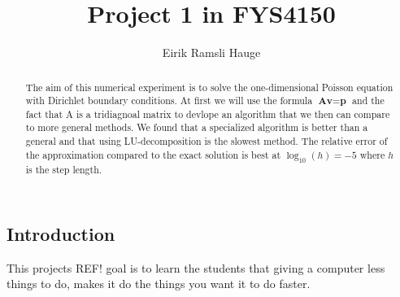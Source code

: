 \documentclass[12pt,a4paper]{article}
\author{Eirik Ramsli Hauge}
\title{Project 1 in FYS4150}
\newcommand{\V}[1]{\textbf{#1}}
\newcommand{\husk}[1]{\color{red} #1 \color{black}}
\begin{document}
	\maketitle
	
\begin{abstract}
The aim of this numerical experiment is to solve the one-dimensional Poisson equation with Dirichlet boundary conditions. At first we will use the formula $\V{A} \V{v} = \V{p}$ and the fact that A is a tridiagnoal matrix to devlope an algorithm that we then can compare to more general methods. We found that a specialized algorithm is better than a general and that using LU-decomposition is the slowest method. The relative error of the approximation compared to the exact solution is best at $\log_{10}(h) = -5$ where $h$ is the step length.
\end{abstract}
\subsection*{Introduction}
This projects\husk{REF!} goal is to learn the students that giving a computer less things to do, makes it do the things you want it to do faster. 
\end{document}
